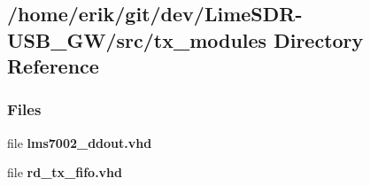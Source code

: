 \subsection{/home/erik/git/dev/\+Lime\+S\+D\+R-\/\+U\+S\+B\+\_\+\+G\+W/src/tx\+\_\+modules Directory Reference}
\label{dir_0e443f0163c8cff5f2d8123e651c7e52}
\subsubsection*{Files}
\begin{DoxyCompactItemize}
\item 
file {\bf lms7002\+\_\+ddout.\+vhd}
\item 
file {\bf rd\+\_\+tx\+\_\+fifo.\+vhd}
\end{DoxyCompactItemize}
